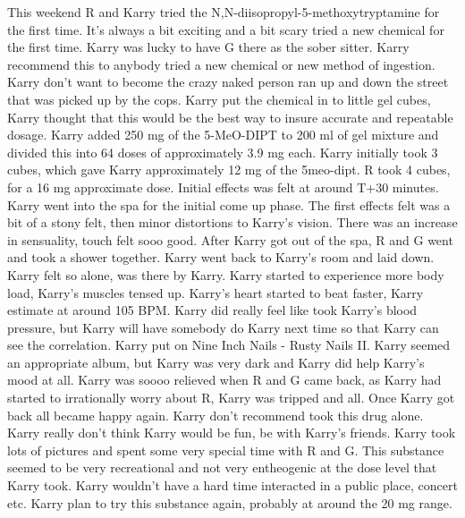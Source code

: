 \documentclass[12pt]{book}
\begin{document}
This weekend R and Karry tried the N,N-diisopropyl-5-methoxytryptamine for the first time. It's always a bit exciting and a bit scary tried a new chemical for the first time. Karry was lucky to have G there as the sober sitter. Karry recommend this to anybody tried a new chemical or new method of ingestion. Karry don't want to become the crazy naked person ran up and down the street that was picked up by the cops. Karry put the chemical in to little gel cubes, Karry thought that this would be the best way to insure accurate and repeatable dosage. Karry added 250 mg of the 5-MeO-DIPT to 200 ml of gel mixture and divided this into 64 doses of approximately 3.9 mg each. Karry initially took 3 cubes, which gave Karry approximately 12 mg of the 5meo-dipt. R took 4 cubes, for a 16 mg approximate dose. Initial effects was felt at around T+30 minutes. Karry went into the spa for the initial come up phase. The first effects felt was a bit of a stony felt, then minor distortions to Karry's vision. There was an increase in sensuality, touch felt sooo good. After Karry got out of the spa, R and G went and took a shower together. Karry went back to Karry's room and laid down. Karry felt so alone, was there by Karry. Karry started to experience more body load, Karry's muscles tensed up. Karry's heart started to beat faster, Karry estimate at around 105 BPM. Karry did really feel like took Karry's blood pressure, but Karry will have somebody do Karry next time so that Karry can see the correlation. Karry put on Nine Inch Nails - Rusty Nails II. Karry seemed an appropriate album, but Karry was very dark and Karry did help Karry's mood at all. Karry was soooo relieved when R and G came back, as Karry had started to irrationally worry about R, Karry was tripped and all. Once Karry got back all became happy again. Karry don't recommend took this drug alone. Karry really don't think Karry would be fun, be with Karry's friends. Karry took lots of pictures and spent some very special time with R and G. This substance seemed to be very recreational and not very entheogenic at the dose level that Karry took. Karry wouldn't have a hard time interacted in a public place, concert etc. Karry plan to try this substance again, probably at around the 20 mg range.
\end{document}
